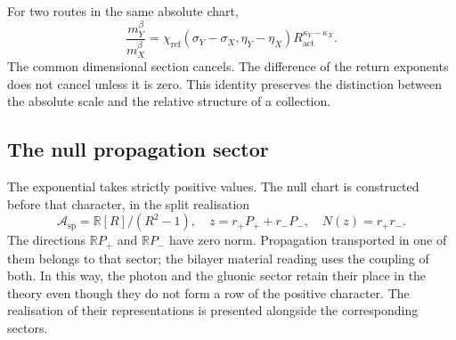 For two routes in the same absolute chart,
\[
 \frac{m_Y^\beta}{m_X^\beta}
 =\chi_{\mathrm{ref}}(\sigma_Y-\sigma_X,\eta_Y-\eta_X)
 R_{\mathrm{act}}^{\kappa_Y-\kappa_X}.
\]
The common dimensional section cancels. The difference of the return
exponents does not cancel unless it is zero. This identity preserves the
distinction between the absolute scale and the relative structure of a collection.

\subsection{The null propagation sector}

The exponential takes strictly positive values. The null chart is
constructed before that character, in the split realisation
\[
 \mathcal A_{\mathrm{sp}}=\mathbb R[R]/(R^2-1),\quad
 z=r_+P_++r_-P_-,\quad N(z)=r_+r_-.
\]
The directions \(\mathbb RP_+\) and \(\mathbb RP_-\) have zero
norm. Propagation transported in one of them belongs to that sector;
the bilayer material reading uses the coupling of both. In this way,
the photon and the gluonic sector retain their place in the theory even though
they do not form a row of the positive character. The realisation of their
representations is presented alongside the corresponding sectors.
